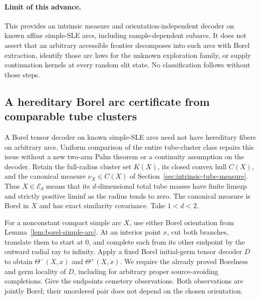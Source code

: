 \documentclass[11pt]{article}
\theoremstyle{definition}\newtheorem{definition}[theorem]{Definition}
\theoremstyle{remark}\newtheorem{remark}[theorem]{Remark}
\begin{document}
\paragraph{Limit of this advance.}
This provides an intrinsic measure and orientation-independent decoder
on known affine simple-SLE arcs, including sample-dependent subarcs.
It does not assert that an arbitrary accessible frontier decomposes
into such arcs with Borel extraction, identify those arc laws for
the unknown exploration family, or supply continuation kernels at
every random slit state. No classification follows without those steps.


\subsection{A hereditary Borel arc certificate from comparable tube clusters}
\label{sec:hereditary-cluster-certificate}

A Borel tensor decoder on known simple-SLE arcs need not have hereditary
fibers on arbitrary arcs. Uniform comparison of the entire tube-cluster
class repairs this issue without a new two-arm Palm theorem or a
continuity assumption on the decoder. Retain the full-radius cluster
set $K(X)$, its closed convex hull $C(X)$, and the canonical measure
$\nu_X\in C(X)$ of Section~\ref{sec:intrinsic-tube-measure}.
Thus $X\in\mathcal E_d$ means that its $d$-dimensional total tube
masses have finite limsup and strictly positive liminf as the radius
tends to zero. The canonical measure is Borel in $X$ and has exact
similarity covariance. Take $1<d<2$.

For a nonconstant compact simple arc $X$, use either Borel orientation
from Lemma~\ref{lem:borel-simple-arc}. At an interior point $x$, cut
both branches, translate them to start at $0$, and complete each from
its other endpoint by the outward radial ray to infinity. Apply a
fixed Borel initial-germ tensor decoder $D$ to obtain
$\Theta^-(X,x)$ and $\Theta^+(X,x)$. We require the already proved
Borelness and germ locality of $D$, including for arbitrary proper
source-avoiding completions. Give the endpoints cemetery observations.
Both observations are jointly Borel; their unordered pair does not
depend on the chosen orientation.
\end{document}
